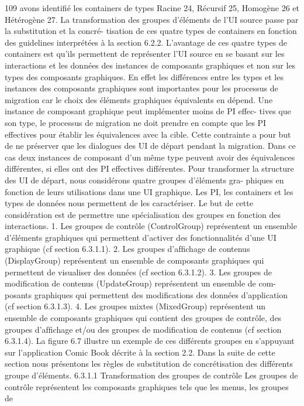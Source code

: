 \documentclass{article}
\begin{document}
109
avons identiﬁé les containers de types Racine 24, Récursif 25, Homogène 26 et Hétérogène 27.
La transformation des groupes d’éléments de l’UI source passe par la substitution et la concré-
tisation de ces quatre types de containers en fonction des guidelines interprétées à la section 6.2.2.
L’avantage de ces quatre types de containers est qu’ils permettent de représenter l’UI source en se
basant sur les interactions et les données des instances de composants graphiques et non sur les types
des composants graphiques. En effet les différences entre les types et les instances des composants
graphiques sont importantes pour les processus de migration car le choix des éléments graphiques
équivalents en dépend. Une instance de composant graphique peut implémenter moins de PI effec-
tives que son type, le processus de migration ne doit prendre en compte que les PI effectives pour
établir les équivalences avec la cible. Cette contrainte a pour but de ne préserver que les dialogues des
UI de départ pendant la migration. Dans ce cas deux instances de composant d’un même type peuvent
avoir des équivalences différentes, si elles ont des PI effectives différentes.
Pour transformer la structure des UI de départ, nous considérons quatre groupes d’éléments gra-
phiques en fonction de leurs utilisations dans une UI graphique. Les PI, les containers et les types
de données nous permettent de les caractériser. Le but de cette considération est de permettre une
spécialisation des groupes en fonction des interactions.
1. Les groupes de contrôle (ControlGroup) représentent un ensemble d’éléments graphiques qui
permettent d’activer des fonctionnalités d’une UI graphique (cf section 6.3.1.1).
2. Les groupes d’afﬁchage de contenus (DisplayGroup) représentent un ensemble de composants
graphiques qui permettent de visualiser des données (cf section 6.3.1.2).
3. Les groupes de modiﬁcation de contenus (UpdateGroup) représentent un ensemble de com-
posants graphiques qui permettent des modiﬁcations des données d’application (cf section
6.3.1.3).
4. Les groupes mixtes (MixedGroup) représentent un ensemble de composants graphiques qui
contient des groupes de contrôle, des groupes d’afﬁchage et/ou des groupes de modiﬁcation de
contenus (cf section 6.3.1.4).
La ﬁgure 6.7 illustre un exemple de ces différents groupes en s’appuyant sur l’application Comic
Book décrite à la section 2.2. Dans la suite de cette section nous présentons les règles de substitution
de concrétisation des différents groupe d’éléments.
6.3.1.1
Transformation des groupes de contrôle
Les groupes de contrôle représentent les composants graphiques tels que les menus, les groupes de
\end{document}
